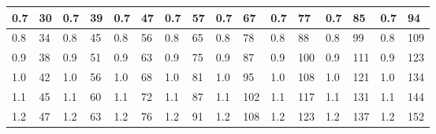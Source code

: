 \documentclass[12pt, a4paper]{article}
\begin{document}
\begin{table}[H]
\begin{tabular}{|ll|ll|ll|ll|ll|ll|ll|ll|}
    \multicolumn{1}{|l|}{0.7}  & 30                         & \multicolumn{1}{l|}{0.7}  & 39                         & \multicolumn{1}{l|}{0.7}  & 47                         & \multicolumn{1}{l|}{0.7}  & 57                         & \multicolumn{1}{l|}{0.7}  & 67                         & \multicolumn{1}{l|}{0.7}  & 77                         & \multicolumn{1}{l|}{0.7}  & 85                         & \multicolumn{1}{l|}{0.7}  & 94                         \\ \hline
    \multicolumn{1}{|l|}{0.8}  & 34                         & \multicolumn{1}{l|}{0.8}  & 45                         & \multicolumn{1}{l|}{0.8}  & 56                         & \multicolumn{1}{l|}{0.8}  & 65                         & \multicolumn{1}{l|}{0.8}  & 78                         & \multicolumn{1}{l|}{0.8}  & 88                         & \multicolumn{1}{l|}{0.8}  & 99                         & \multicolumn{1}{l|}{0.8}  & 109                        \\ \hline
    \multicolumn{1}{|l|}{0.9}  & 38                         & \multicolumn{1}{l|}{0.9}  & 51                         & \multicolumn{1}{l|}{0.9}  & 63                         & \multicolumn{1}{l|}{0.9}  & 75                         & \multicolumn{1}{l|}{0.9}  & 87                         & \multicolumn{1}{l|}{0.9}  & 100                        & \multicolumn{1}{l|}{0.9}  & 111                        & \multicolumn{1}{l|}{0.9}  & 123                        \\ \hline
    \multicolumn{1}{|l|}{1.0}  & 42                         & \multicolumn{1}{l|}{1.0}  & 56                         & \multicolumn{1}{l|}{1.0}  & 68                         & \multicolumn{1}{l|}{1.0}  & 81                         & \multicolumn{1}{l|}{1.0}  & 95                         & \multicolumn{1}{l|}{1.0}  & 108                        & \multicolumn{1}{l|}{1.0}  & 121                        & \multicolumn{1}{l|}{1.0}  & 134                        \\ \hline
    \multicolumn{1}{|l|}{1.1}  & 45                         & \multicolumn{1}{l|}{1.1}  & 60                         & \multicolumn{1}{l|}{1.1}  & 72                         & \multicolumn{1}{l|}{1.1}  & 87                         & \multicolumn{1}{l|}{1.1}  & 102                        & \multicolumn{1}{l|}{1.1}  & 117                        & \multicolumn{1}{l|}{1.1}  & 131                        & \multicolumn{1}{l|}{1.1}  & 144                        \\ \hline
    \multicolumn{1}{|l|}{1.2}  & 47                         & \multicolumn{1}{l|}{1.2}  & 63                         & \multicolumn{1}{l|}{1.2}  & 76                         & \multicolumn{1}{l|}{1.2}  & 91                         & \multicolumn{1}{l|}{1.2}  & 108                        & \multicolumn{1}{l|}{1.2}  & 123                        & \multicolumn{1}{l|}{1.2}  & 137                        & \multicolumn{1}{l|}{1.2}  & 152                        \\ \hline

\end{tabular}
\end{table}
\end{document}
